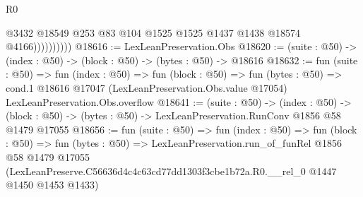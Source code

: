 \begin{lexlean}{R0}
\begin{coremodule}
                      @3432 @18549 @253 @83 @104 @1525 @1525 @1437 @1438 @18574 @4166))))))))))
@18616 := LexLeanPreservation.Obs
@18620 := (suite : @50) -> (index : @50) -> (block : @50) -> (bytes : @50) -> @18616
@18632 := fun (suite : @50) =>
  fun (index : @50) =>
  fun (block : @50) =>
  fun (bytes : @50) =>
  cond.{1} @18616 @17047 (LexLeanPreservation.Obs.value @17054) LexLeanPreservation.Obs.overflow
@18641 := (suite : @50) ->
  (index : @50) ->
  (block : @50) -> (bytes : @50) -> LexLeanPreservation.RunConv @1856 @58 @1479 @17055
@18656 := fun (suite : @50) =>
  fun (index : @50) =>
  fun (block : @50) =>
  fun (bytes : @50) =>
  LexLeanPreservation.run_of_funRel
    @1856
    @58
    @1479
    @17055
    (LexLeanPreserve.C56636d4c4c63cd77dd1303f3cbe1b72a.R0.__rel_0 @1447 @1450 @1453 @1433)
\end{coremodule}
\end{lexlean}
